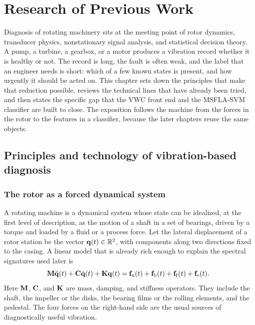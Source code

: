 \chapter{Research of Previous Work}
\label{ch:previous}

Diagnosis of rotating machinery sits at the meeting point of rotor dynamics, transducer physics, nonstationary signal analysis, and statistical decision theory.
A pump, a turbine, a gearbox, or a motor produces a vibration record whether it is healthy or not.
The record is long, the fault is often weak, and the label that an engineer needs is short: which of a few known states is present, and how urgently it should be acted on.
This chapter sets down the principles that make that reduction possible, reviews the technical lines that have already been tried, and then states the specific gap that the VWC front end and the MSFLA-SVM classifier are built to close.
The exposition follows the machine from the forces in the rotor to the features in a classifier, because the later chapters reuse the same objects.

\section{Principles and technology of vibration-based diagnosis}
\label{sec:principles}

\subsection{The rotor as a forced dynamical system}

A rotating machine is a dynamical system whose state can be idealized, at the first level of description, as the motion of a shaft in a set of bearings, driven by a torque and loaded by a fluid or a process force.
Let the lateral displacement of a rotor station be the vector \(\mathbf{q}(t)\in\mathbb{R}^{2}\), with components along two directions fixed to the casing.
A linear model that is already rich enough to explain the spectral signatures used later is
\begin{equation}
\mathbf{M}\ddot{\mathbf{q}}(t)+\mathbf{C}\dot{\mathbf{q}}(t)+\mathbf{K}\mathbf{q}(t)
=\mathbf{f}_{\mathrm{u}}(t)+\mathbf{f}_{\mathrm{b}}(t)+\mathbf{f}_{\mathrm{f}}(t)+\mathbf{f}_{\mathrm{e}}(t).
\label{eq:rotor}
\end{equation}
Here \(\mathbf{M}\), \(\mathbf{C}\), and \(\mathbf{K}\) are mass, damping, and stiffness operators.
They include the shaft, the impeller or the disks, the bearing films or the rolling elements, and the pedestal.
The four forces on the right-hand side are the usual sources of diagnostically useful vibration.

